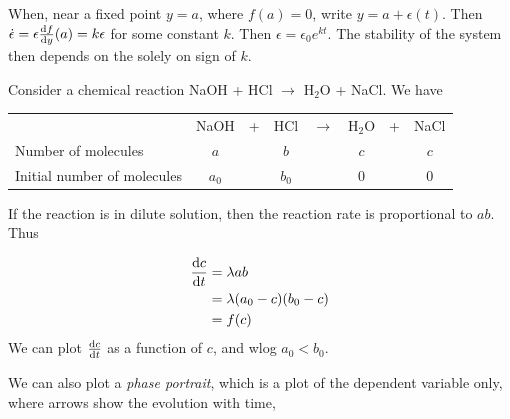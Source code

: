 \documentclass[a4paper]{article}
\begin{document}
  When, near a fixed point $y = a$, where $f(a) = 0$, write $y = a + \epsilon(t)$. Then $\dot \epsilon = \epsilon\frac{\mathrm{d} f}{\mathrm{d} y}(a) = k\epsilon$ for some constant $k$. Then $\epsilon = \epsilon_0 e^{kt}$. The stability of the system then depends on the solely on sign of $k$.

  \begin{eg}
    Consider a chemical reaction NaOH + HCl $\rightarrow$ H$_2$O + NaCl. We have\vspace{4pt} \\
    \begin{tabular}{lccccccc}
      & NaOH  & + & HCl   & $\rightarrow$ & H$_2$O & + & NaCl \\
      Number of molecules         & $a$   &   & $b$   &               & $c$    &   & $c$  \\
      Initial number of molecules & $a_0$ &   & $b_0$ &               & $0$    &   & $0$
    \end{tabular}
    \vspace{4pt}

    If the reaction is in dilute solution, then the reaction rate is proportional to $ab$. Thus

    \begin{align*}
      \frac{\mathrm{d} c}{\mathrm{d} t} &= \lambda ab\\
      &= \lambda (a_0 - c)(b_0 - c)\\
      &= f(c)
    \end{align*}
    We can plot $\frac{\mathrm{d} c}{\mathrm{d} t}$ as a function of $c$, and wlog $a_0 < b_0$.

    \begin{center}
    \end{center}

    We can also plot a \emph{phase portrait}, which is a plot of the dependent variable only, where arrows show the evolution with time,

    \begin{center}
    \end{center}


\end{eg}
\end{document}
